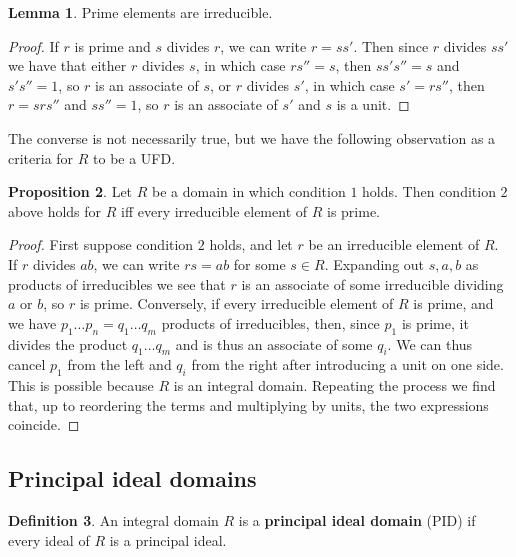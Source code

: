 \documentclass{article}
\theoremstyle{definition}\newtheorem{definition}{Definition}[subsection]
\theoremstyle{definition}\newtheorem{remark}[definition]{Remark}
\theoremstyle{definition}\newtheorem*{example}{Example}
\theoremstyle{definition}\newtheorem*{note}{Note}
\newtheorem{proposition}[definition]{Proposition}
\newtheorem{lemma}[definition]{Lemma}
\begin{document}
\begin{lemma}
Prime elements are irreducible.
\end{lemma}

\begin{proof}
If $ r $ is prime and $ s $ divides $ r $, we can write $ r = ss' $. Then since $ r $ divides $ ss' $ we have that either $ r $ divides $ s $, in which case $ rs'' = s $, then $ ss's'' = s $ and $ s's'' = 1 $, so $ r $ is an associate of $ s $, or $ r $ divides $ s' $, in which case $ s' = rs'' $, then $ r = srs'' $ and $ ss'' = 1 $, so $ r $ is an associate of $ s' $ and $ s $ is a unit.
\end{proof}

The converse is not necessarily true, but we have the following observation as a criteria for $ R $ to be a UFD.

\begin{proposition}
Let $ R $ be a domain in which condition $ 1 $ holds. Then condition $ 2 $ above holds for $ R $ iff every irreducible element of $ R $ is prime.
\end{proposition}

\begin{proof}
First suppose condition $ 2 $ holds, and let $ r $ be an irreducible element of $ R $. If $ r $ divides $ ab $, we can write $ rs = ab $ for some $ s \in R $. Expanding out $ s, a, b $ as products of irreducibles we see that $ r $ is an associate of some irreducible dividing $ a $ or $ b $, so $ r $ is prime. Conversely, if every irreducible element of $ R $ is prime, and we have $ p_1 \dots p_n = q_1 \dots q_m $ products of irreducibles, then, since $ p_1 $ is prime, it divides the product $ q_1 \dots q_m $ and is thus an associate of some $ q_i $. We can thus cancel $ p_1 $ from the left and $ q_i $ from the right after introducing a unit on one side. This is possible because $ R $ is an integral domain. Repeating the process we find that, up to reordering the terms and multiplying by units, the two expressions coincide.
\end{proof}

\subsection{Principal ideal domains}

\begin{definition}
An integral domain $ R $ is a \textbf{principal ideal domain} (PID) if every ideal of $ R $ is a principal ideal.
\end{definition}
\end{document}
